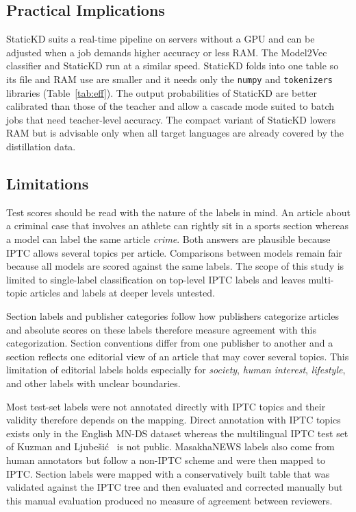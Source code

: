\documentclass{ieeeaccess}
\begin{document}
\subsection{Practical Implications}
StaticKD suits a real-time pipeline on servers without a GPU and can be adjusted when a job demands higher accuracy or less RAM. The Model2Vec classifier and StaticKD run at a similar speed. StaticKD folds into one table so its file and RAM use are smaller and it needs only the \texttt{numpy} and \texttt{tokenizers} libraries (Table~\ref{tab:eff}). The output probabilities of StaticKD are better calibrated than those of the teacher and allow a cascade mode suited to batch jobs that need teacher-level accuracy. The compact variant of StaticKD lowers RAM but is advisable only when all target languages are already covered by the distillation data.

\subsection{Limitations}
\label{sec:limitations}
Test scores should be read with the nature of the labels in mind. An article about a criminal case that involves an athlete can rightly sit in a sports section whereas a model can label the same article \emph{crime}. Both answers are plausible because IPTC allows several topics per article. Comparisons between models remain fair because all models are scored against the same labels. The scope of this study is limited to single-label classification on top-level IPTC labels and leaves multi-topic articles and labels at deeper levels untested.

Section labels and publisher categories follow how publishers categorize articles and absolute scores on these labels therefore measure agreement with this categorization. Section conventions differ from one publisher to another and a section reflects one editorial view of an article that may cover several topics. This limitation of editorial labels holds especially for \emph{society}, \emph{human interest}, \emph{lifestyle}, and other labels with unclear boundaries.

Most test-set labels were not annotated directly with IPTC topics and their validity therefore depends on the mapping. Direct annotation with IPTC topics exists only in the English MN-DS dataset whereas the multilingual IPTC test set of Kuzman and Ljube\v{s}i\'c~\cite{kuzman2025llm} is not public. MasakhaNEWS labels also come from human annotators but follow a non-IPTC scheme and were then mapped to IPTC. Section labels were mapped with a conservatively built table that was validated against the IPTC tree and then evaluated and corrected manually but this manual evaluation produced no measure of agreement between reviewers.
\end{document}
